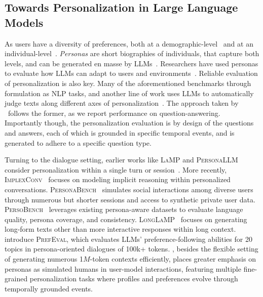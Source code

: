 \subsection{Towards Personalization in Large Language Models}
As users have a diversity of preferences, both at a demographic-level~\citep{santurkar2023whose} and at an individual-level~\citep{zollo2024personalllm}. \textit{Personas} are short biographies of individuals, that capture both levels, and can be generated en masse by LLMs~\citep{ge2024scaling}. Researchers have used personas to evaluate how LLMs can adapt to users and environments~\citep{castricato2024persona,tseng2024two}.
Reliable evaluation of personalization is also key. Many of the aforementioned benchmarks through formulation as NLP tasks, and another line of work uses LLMs to automatically judge texts along different axes of personalization~\citep{dong2024can, wang2023automated}. The approach taken by \datasetname~follows the former, as we report performance on question-answering. Importantly though, the personalization evaluation is by design of the questions and answers, each of which is grounded in specific temporal events, and is generated to adhere to a specific question type.

Turning to the dialogue setting, earlier works like \textsc{LaMP} and \textsc{PersonaLLM} consider personalization within a single turn or session~\citep{salemi2023lamp, jiang2023personallm, kirk2024prism}. More recently, \textsc{ImplexConv}~\citep{li2025toward} focuses on modeling implicit reasoning within personalized conversations. \textsc{PersonaBench}~\citep{tan2025personabench} simulates social interactions among diverse users through numerous but shorter sessions and access to synthetic private user data. \textsc{PersoBench}~\citep{afzoon2024persobench} leverages existing persona-aware datasets to evaluate language quality, persona coverage, and consistency. \textsc{LongLaMP}~\citep{kumar2024longlamp} focuses on generating long-form texts other than more interactive responses within long context. \cite{zhao2025prefeval} introduce \textsc{PrefEval}, which evaluates LLMs' preference-following abilities for 20 topics in persona-oriented dialogues of 100k+ tokens. \datasetname, besides the flexible setting of generating numerous 1$M$-token contexts efficiently, places greater emphasis on personas as simulated humans in user-model interactions, featuring multiple fine-grained personalization tasks where profiles and preferences evolve through temporally grounded events.

